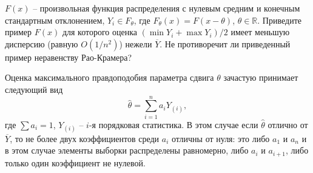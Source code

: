 \begin{problem}
$F(x)$ -- произвольная функция распределения с нулевым средним и конечным стандартным отклонением, $Y_i \in F_\theta$, где $F_\theta(x) = F(x -\theta)$, $\theta \in \mathbb{R}$. Приведите пример $F(x)$ для которого оценка $(\min Y_i + \max Y_i) / 2$ имеет меньшую дисперсию (равную $O(1/n^2)$) нежели $\overline{Y}$. Не противоречит ли приведенный пример неравенству Рао-Крамера? 
\end{problem}

\begin{remark}
Оценка максимального правдоподобия параметра сдвига $\theta$ зачастую принимает следующий вид 
\[
\widehat{\theta} = \sum \limits_{i = 1}^n a_i Y_{(i)},  
\]
где $\sum a_i = 1$, $Y_{(i)}$ -- $i$-я порядковая статистика.
В этом случае если $\widehat{\theta}$ отлично от $\overline{Y}$, то не более двух коэффициентов среди $a_i$ отличны от нуля: это либо $a_1$ и  $a_n$ и в этом случае элементы выборки распределены равномерно, либо $a_i$ и  $a_{i+1}$, либо только один коэффициент не нулевой.
\end{remark}


